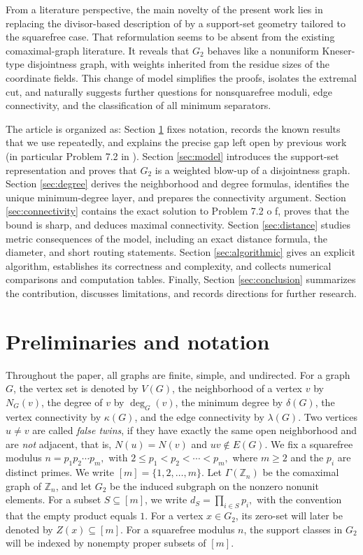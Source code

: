 \documentclass[12pt]{article}
\theoremstyle{definition}
\begin{document}
	From a literature perspective, the main novelty of the present work lies in replacing the divisor-based description of \cite{Banerjee2022,afkhami} by a support-set geometry tailored to the squarefree case. That reformulation seems to be absent from the existing comaximal-graph literature. It reveals that $G_2$ behaves like a nonuniform Kneser-type disjointness graph, with weights inherited from the residue sizes of the coordinate fields. This change of model simplifies the proofs, isolates the extremal cut, and naturally suggests further questions for nonsquarefree moduli, edge connectivity, and the classification of all minimum separators.
	
	\medskip
	
	The article is organized as: Section \ref{sec:prelim} fixes notation, records the known results that we use repeatedly, and explains the precise gap left open by previous work (in particular Problem 7.2 in \cite{Banerjee2022}). Section \ref{sec:model} introduces the support-set representation and proves that $G_2$ is a weighted blow-up of a disjointness graph. Section \ref{sec:degree} derives the neighborhood and degree formulas, identifies the unique minimum-degree layer, and prepares the connectivity argument. Section \ref{sec:connectivity} contains the exact solution to Problem 7.2 o f\cite{Banerjee2022}, proves that the bound is sharp, and deduces maximal connectivity. Section \ref{sec:distance} studies metric consequences of the model, including an exact distance formula, the diameter, and short routing statements. Section \ref{sec:algorithmic} gives an explicit algorithm, establishes its correctness and complexity, and collects numerical comparisons and computation tables. Finally, Section \ref{sec:conclusion} summarizes the contribution, discusses limitations, and records directions for further research.
	
	\section{Preliminaries and notation}\label{sec:prelim}
	
	Throughout the paper, all graphs are finite, simple, and undirected. For a graph $G$, the vertex set is denoted by $V(G)$, the neighborhood of a vertex $v$ by $N_G(v)$, the degree of $v$ by $\deg_G(v)$, the minimum degree by $\delta(G)$, the vertex connectivity by $\kappa(G)$, and the edge connectivity by $\lambda(G)$.  
	Two vertices $u\neq v$ are called \emph{false twins}, if they have exactly the same open neighborhood and are \emph{not} adjacent, that is,  $N(u) = N(v)$ and $uv \notin E(G).$	
	We fix a squarefree modulus
	$ n=p_1p_2\cdots p_m,$ with $ 2\leq p_1<p_2<\cdots<p_m, $
	where $m\geq 2$ and the $p_i$ are distinct primes. We write $[m]=\{1,2,\dots,m\}$. Let $\Gamma(\mathbb Z_n)$ be the comaximal graph of $\mathbb Z_n$, and let $G_2$ be the induced subgraph on the nonzero nonunit elements.
	 For a subset $S\subseteq [m]$, we write $ d_S=\prod_{i\in S}p_i, $ 	with the convention that the empty product equals $1$. For a vertex $x\in G_2$, its zero-set will later be denoted by $Z(x)\subseteq [m]$. 
	 For a squarefree modulus $n$, the support classes in $G_2$ will be indexed by nonempty proper subsets of $[m]$. 
	
\end{document}
